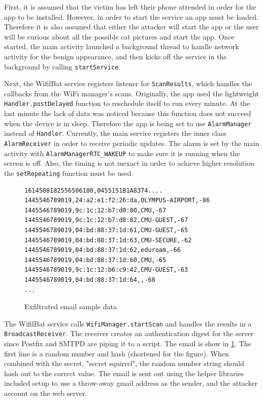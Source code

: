 \documentclass[conference,compsoc]{IEEEtran}
\begin{document}
First, it is assumed that the victim has left their phone attended in order for the app to be installed. However, in order to start the service an app must be loaded. Therefore it is also assumed that either the attacker will start the app or the user will be curious about all the possible cat pictures and start the app. Once started, the main activity launched a background thread to handle network activity for the benign appearance, and then kicks off the service in the background by calling \texttt{startService}.

Next, the WifilBat service registers listener for \texttt{ScanResults}, which handles the callbacks from the WiFi manager's scans. Originally, the app used the lightweight \texttt{Handler.postDelayed} function to reschedule itself to run every minute. At the last minute the lack of data was noticed because this function does not succeed when the device is in sleep. Therefore the app is being set to use \texttt{AlarmManager} instead of \texttt{Handler}. Currently, the main service registers the inner class \texttt{AlarmReceiver} in order to receive periodic updates. The alarm is set by the main activity with \texttt{AlarmManager\.RTC\_WAKEUP} to make sure it is running when the screen is off. Also, the timing is not inexact in order to achieve higher resolution the \texttt{setRepeating} function must be used\cite{Google:Alarms}.

\begin{figure}
  \begin{lstlisting}
1614508182556506180,0455151B1A8374....
1445546789019,24:a2:e1:f2:26:da,OLYMPUS-AIRPORT,-86
1445546789019,9c:1c:12:b7:d0:80,CMU,-67
1445546789019,9c:1c:12:b7:d0:82,CMU-GUEST,-67
1445546789019,04:bd:88:37:1d:61,CMU-GUEST,-65
1445546789019,04:bd:88:37:1d:63,CMU-SECURE,-62
1445546789019,04:bd:88:37:1d:62,eduroam,-66
1445546789019,04:bd:88:37:1d:60,CMU,-65
1445546789019,9c:1c:12:b6:c9:42,CMU-GUEST,-63
1445546789019,04:bd:88:37:1d:64,,-68
...
\end{lstlisting}
\caption{Exfiltrated email sample data}
\label{fig:email}
\end{figure}

The WifilBat service calls \texttt{WifiManager.startScan} and handles the results in a \texttt{BroadcastReceiver}. The receiver creates an authentication digest for the server since Postfix and SMTPD are piping it to a script. The email is show in \ref{fig:email}. The first line is a random number and hash (shortened for the figure). When combined with the secret, "secret squirrel", the random number string should hash out to the correct value. The email is sent out using the helper libraries included setup to use a throw-away gmail address as the sender, and the attacker account on the web server.
\end{document}
